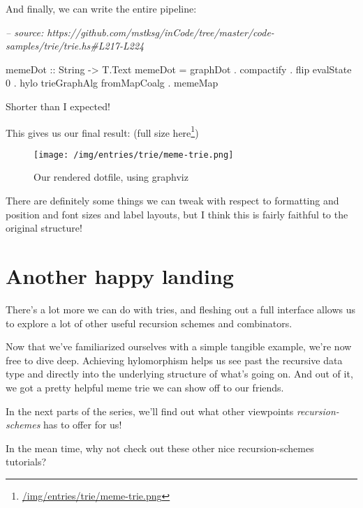 \documentclass[]{article}
\newenvironment{Shaded}{}{}
\newcommand{\CommentTok}[1]{\textcolor[rgb]{0.38,0.63,0.69}{\textit{#1}}}
\newcommand{\DataTypeTok}[1]{\textcolor[rgb]{0.56,0.13,0.00}{#1}}
\newcommand{\DecValTok}[1]{\textcolor[rgb]{0.25,0.63,0.44}{#1}}
\newcommand{\FunctionTok}[1]{\textcolor[rgb]{0.02,0.16,0.49}{#1}}
\newcommand{\NormalTok}[1]{#1}
\newcommand{\OtherTok}[1]{\textcolor[rgb]{0.00,0.44,0.13}{#1}}
\renewcommand{\href}[2]{#2\footnote{\url{#1}}}
\begin{document}
And finally, we can write the entire pipeline:

\begin{Shaded}
\begin{Highlighting}[]
\CommentTok{-- source: https://github.com/mstksg/inCode/tree/master/code-samples/trie/trie.hs#L217-L224}

\NormalTok{memeDot}
\OtherTok{    ::} \DataTypeTok{String}
    \OtherTok{->} \DataTypeTok{T.Text}
\NormalTok{memeDot }\FunctionTok{=}\NormalTok{ graphDot}
        \FunctionTok{.}\NormalTok{ compactify}
        \FunctionTok{.} \FunctionTok{flip}\NormalTok{ evalState }\DecValTok{0}
        \FunctionTok{.}\NormalTok{ hylo trieGraphAlg fromMapCoalg}
        \FunctionTok{.}\NormalTok{ memeMap}
\end{Highlighting}
\end{Shaded}

Shorter than I expected!

This gives us our final result: (\href{/img/entries/trie/meme-trie.png}{full
size here})

\begin{figure}
\centering
\texttt{[image: /img/entries/trie/meme-trie.png]}
\caption{Our rendered dotfile, using graphviz}
\end{figure}

There are definitely some things we can tweak with respect to formatting and
position and font sizes and label layouts, but I think this is fairly faithful
to the original structure!

\hypertarget{another-happy-landing}{%
\section{Another happy landing}\label{another-happy-landing}}

There's a lot more we can do with tries, and fleshing out a full interface
allows us to explore a lot of other useful recursion schemes and combinators.

Now that we've familiarized ourselves with a simple tangible example, we're now
free to dive deep. Achieving hylomorphism helps us see past the recursive data
type and directly into the underlying structure of what's going on. And out of
it, we got a pretty helpful meme trie we can show off to our friends.

In the next parts of the series, we'll find out what other viewpoints
\emph{recursion-schemes} has to offer for us!

In the mean time, why not check out these other nice recursion-schemes
tutorials?
\end{document}
